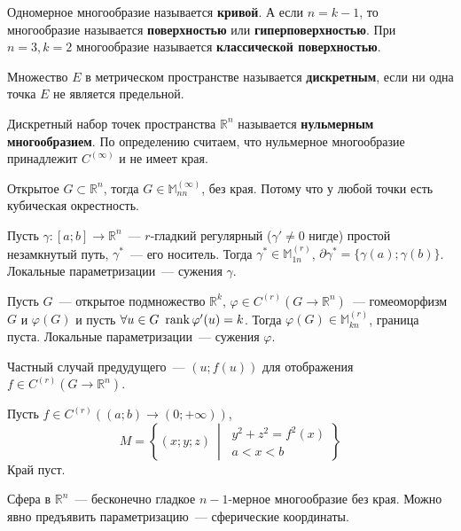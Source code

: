\documentclass{article}
\let\tmp\varphi
\let\varphi\phi
\let\phi\tmp
\begin{document}
    \begin{definition}
        Одномерное многообразие называется \textbf{кривой}. А если $n=k-1$, то многообразие называется \textbf{поверхностью} или \textbf{гиперповерхностью}. При $n=3,k=2$ многообразие называется \textbf{классической поверхностью}.
    \end{definition}
    \begin{definition}
        Множество $E$ в метрическом пространстве называется \textbf{дискретным}, если ни одна точка $E$ не является предельной.
    \end{definition}
    \begin{definition}
        Дискретный набор точек пространства $\mathbb R^n$ называется \textbf{нульмерным многообразием}. По определению считаем, что нульмерное многообразие принадлежит $C^{(\infty)}$ и не имеет края.
    \end{definition}
    \begin{example}
        Открытое $G\subset\mathbb R^n$, тогда $G\in\mathbb M_{nn}^{(\infty)}$, без края. Потому что у любой точки есть кубическая окрестность.
    \end{example}
    \begin{example}
        Пусть $\gamma\colon[a;b]\to\mathbb R^n$~--- $r$-гладкий регулярный ($\gamma'\neq0$ нигде) простой незамкнутый путь, $\gamma^*$~--- его носитель. Тогда $\gamma^*\in\mathbb M_{1n}^{(r)}$, $\partial\gamma^*=\{\gamma(a);\gamma(b)\}$. Локальные параметризации~--- сужения $\gamma$.
    \end{example}
    \begin{example}
        Пусть $G$~--- открытое подмножество $\mathbb R^k$, $\phi\in C^{(r)}(G\to\mathbb R^n)$~--- гомеоморфизм $G$ и $\phi(G)$ и пусть $\forall u\in G~\rank\phi'(u)=k$. Тогда $\phi(G)\in\mathbb M_{kn}^{(r)}$, граница пуста. Локальные параметризации~--- сужения $\phi$.
    \end{example}
    \begin{example}
        Частный случай предудущего~--- $(u;f(u))$ для отображения $f\in C^{(r)}(G\to\mathbb R^n)$.
    \end{example}
    \begin{example}
        Пусть $f\in C^{(r)}((a;b)\to(0;+\infty))$,
        $$
        M=\left\{(x;y;z)~\middle|~\substack{y^2+z^2=f^2(x)\\a<x<b}\right\}
        $$
        Край пуст.
    \end{example}
    \begin{example}
        Сфера в $\mathbb R^n$~--- бесконечно гладкое $n-1$-мерное многообразие без края. Можно явно предъявить параметризацию~--- сферические координаты.
    \end{example}
\end{document}
